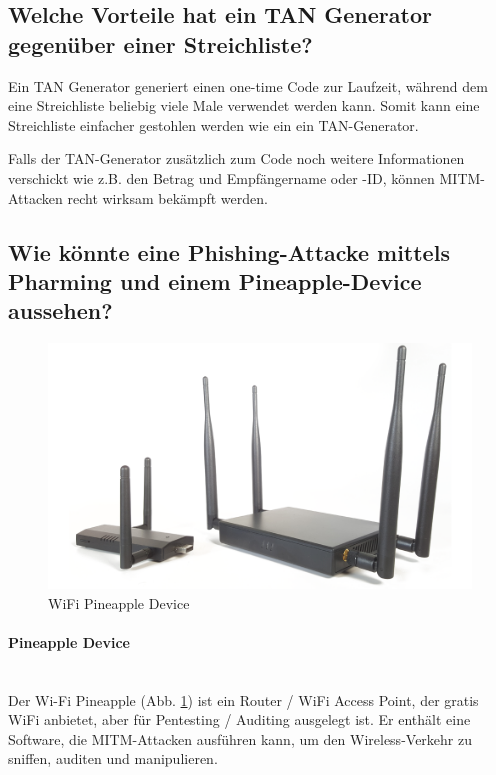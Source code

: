 \documentclass[a4paper, 11pt, nofootinbib]{article}
\begin{document}
\subsection{Welche Vorteile hat ein TAN Generator gegenüber einer Streichliste?}
Ein TAN Generator generiert einen one-time Code zur Laufzeit, während dem eine Streichliste beliebig viele Male verwendet werden kann. Somit kann eine Streichliste einfacher gestohlen werden wie ein ein TAN-Generator.

Falls der TAN-Generator zusätzlich zum Code noch weitere Informationen verschickt wie z.B. den Betrag und Empfängername oder -ID, können MITM-Attacken recht wirksam bekämpft werden.

\subsection{Wie könnte eine Phishing-Attacke mittels Pharming und einem Pineapple-Device aussehen?}

\begin{figure}
	\centering
	\includegraphics[keepaspectratio=true,height=10\baselineskip]{pineapple.png}
	\caption{WiFi Pineapple Device}
	\label{fig:pineapple}
\end{figure}

\paragraph{Pineapple Device}\mbox{}\\
Der Wi-Fi Pineapple (Abb. \ref{fig:pineapple}) ist ein Router / WiFi Access Point, der gratis WiFi anbietet, aber für Pentesting / Auditing ausgelegt ist. Er enthält eine Software, die MITM-Attacken ausführen kann, um den Wireless-Verkehr zu sniffen, auditen und manipulieren. 
\end{document}
